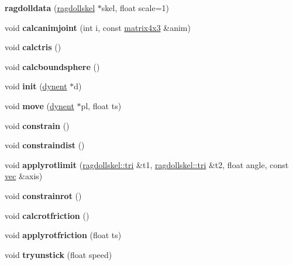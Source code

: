 \begin{DoxyCompactItemize}
\item 
\mbox{\label{structragdolldata_a48f7a4382a7ffed33e3708e937b00351}} 
{\bfseries ragdolldata} (\hyperlink{structragdollskel}{ragdollskel} $\ast$skel, float scale=1)
\item 
\mbox{\label{structragdolldata_a39710eeb3331be2f6247c41f1bb0e2a5}} 
void {\bfseries calcanimjoint} (int i, const \hyperlink{structmatrix4x3}{matrix4x3} \&anim)
\item 
\mbox{\label{structragdolldata_ae31738741b9d032c45141c87ba51df5c}} 
void {\bfseries calctris} ()
\item 
\mbox{\label{structragdolldata_a4641c34c3e8875897a5ed7729b57e9cb}} 
void {\bfseries calcboundsphere} ()
\item 
\mbox{\label{structragdolldata_af3b53f990a9384c2dd61f86b1b82fa25}} 
void {\bfseries init} (\hyperlink{structdynent}{dynent} $\ast$d)
\item 
\mbox{\label{structragdolldata_aa45fbba884f3740c0d200d9146bcd27a}} 
void {\bfseries move} (\hyperlink{structdynent}{dynent} $\ast$pl, float ts)
\item 
\mbox{\label{structragdolldata_af7c6bbce772c9167c0c964c694aa77ca}} 
void {\bfseries constrain} ()
\item 
\mbox{\label{structragdolldata_ac078dec09b79c4da24de60cea48a72ca}} 
void {\bfseries constraindist} ()
\item 
\mbox{\label{structragdolldata_a4681967e1a1137d1297c20518fedc46d}} 
void {\bfseries applyrotlimit} (\hyperlink{structragdollskel_1_1tri}{ragdollskel\+::tri} \&t1, \hyperlink{structragdollskel_1_1tri}{ragdollskel\+::tri} \&t2, float angle, const \hyperlink{structvec}{vec} \&axis)
\item 
\mbox{\label{structragdolldata_a5ffae5c77676b2be60f9dcf686a7fd7f}} 
void {\bfseries constrainrot} ()
\item 
\mbox{\label{structragdolldata_a0770b9babfe9ef764188899bd52b88e5}} 
void {\bfseries calcrotfriction} ()
\item 
\mbox{\label{structragdolldata_a66098bc6578d4b0ae0c1ba8b2a1152e5}} 
void {\bfseries applyrotfriction} (float ts)
\item 
\mbox{\label{structragdolldata_aa4db4c50d2ad726ba88f4aa7f962b508}} 
void {\bfseries tryunstick} (float speed)
\end{DoxyCompactItemize}
